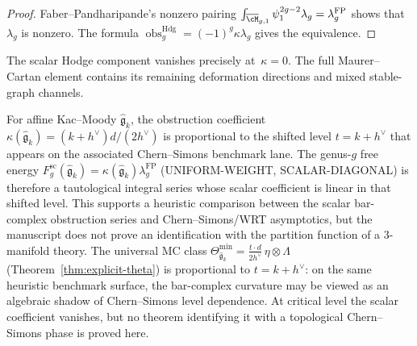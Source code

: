 \begin{proof}
Faber--Pandharipande's nonzero pairing
\(
 \int_{\overline{\cM}_{g,1}}\psi_1^{2g-2}\lambda_g
 =\lambda_g^{\mathrm{FP}}
\)
shows that~$\lambda_g$ is nonzero.  The formula
$\operatorname{obs}^{\mathrm{Hdg}}_g
=(-1)^g\kappa\lambda_g$ gives the equivalence.
\end{proof}

\begin{remark}
\label{rem:dichotomy-theta}
The scalar Hodge component vanishes precisely at~$\kappa=0$.
The full Maurer--Cartan element contains its remaining deformation
directions and mixed stable-graph channels.
\end{remark}


\begin{remark}\label{rem:kappa-chern-simons}
For affine Kac--Moody $\widehat{\mathfrak{g}}_k$, the obstruction
coefficient
\(\kappa(\widehat{\mathfrak g}_k)=(k+h^\vee)d/(2h^\vee)\)
is proportional to the
shifted level $t = k + h^\vee$ that appears on the associated
Chern--Simons benchmark lane. The genus-$g$ free energy
\(F_g^{\mathrm{sc}}(\widehat{\mathfrak g}_k)
=\kappa(\widehat{\mathfrak g}_k)\lambda_g^{\mathrm{FP}}\)
\textup{(}UNIFORM-WEIGHT, SCALAR-DIAGONAL\textup{)} is therefore a tautological
integral series whose scalar coefficient is linear in that shifted
level. This supports a heuristic comparison between the scalar
bar-complex obstruction series and Chern--Simons/WRT asymptotics,
but the manuscript does not prove an identification with the
partition function of a $3$-manifold theory.
The universal MC class
$\Theta_{\widehat{\mathfrak{g}}_k}^{\min} =
\frac{t \cdot d}{2h^\vee}\,\eta \otimes \Lambda$
(Theorem~\ref{thm:explicit-theta}) is proportional to
$t = k + h^\vee$: on the same heuristic benchmark surface, the
bar-complex curvature may be viewed as an algebraic shadow of
Chern--Simons level dependence. At critical level the scalar
coefficient vanishes, but no theorem identifying it with a
topological Chern--Simons phase is proved here.
\end{remark}

